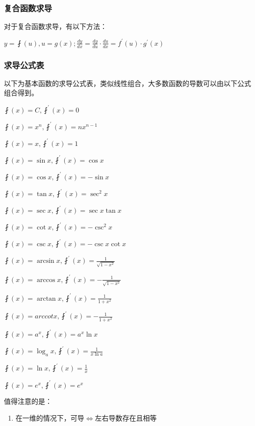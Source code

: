 \documentclass[UTF8]{ctexbook}
\newcommand{\derivative}{^\prime}
\newcommand{\myLeftRightArrow}{$\Leftrightarrow$}
\begin{document}
{{{  \subsubsection{复合函数求导}{
    对于复合函数求导，有以下方法：

    $y = \fint(u), u = g(x); \frac{dy}{dx} = \frac{dy}{du} \cdot \frac{du}{dx} = f\derivative(u) \cdot g\derivative(x)$
  }%

  \subsubsection{求导公式表}{
    以下为基本函数的求导公式表，类似线性组合，大多数函数的导数可以由以下公式组合得到。

    $\fint(x) = C, \fint\derivative(x) = 0$

    $\fint(x) = x^n, \fint\derivative(x) = nx^{n-1}$

    $\fint(x) = x, \fint\derivative(x) = 1$

    $\fint(x) = \sin x, \fint\derivative(x) = \cos x$

    $\fint(x) = \cos x, \fint\derivative(x) = -\sin x$

    $\fint(x) = \tan x, \fint\derivative(x) = \sec^2 x$

    $\fint(x) = \sec x, \fint\derivative(x) = \sec x\tan x$

    $\fint(x) = \cot x, \fint\derivative(x) = -\csc^2 x$

    $\fint(x) = \csc x, \fint\derivative(x) = -\csc x\cot x$

    $\fint(x) = \arcsin x, \fint\derivative(x) = \frac{1}{\sqrt{1 - x^2}}$

    $\fint(x) = \arccos x, \fint\derivative(x) = -\frac{1}{\sqrt{1 - x^2}}$

    $\fint(x) = \arctan x, \fint\derivative(x) = \frac{1}{1 + x^2}$

    $\fint(x) = arccotx, \fint\derivative(x) = -\frac{1}{1 + x^2}$

    $\fint(x) = a^x, \fint\derivative(x) = a^x\ln x$

    $\fint(x) = \log_a x, \fint\derivative(x) = \frac{1}{x\ln a}$

    $\fint(x) = \ln x, \fint\derivative(x)= \frac{1}{x}$

    $\fint(x) = e^x, \fint\derivative(x) = e^x$
  }%
  \newline

  值得注意的是：
  \begin{enumerate}
    \item 在一维的情况下，可导\myLeftRightArrow 左右导数存在且相等


\end{enumerate}}}}
\end{document}
